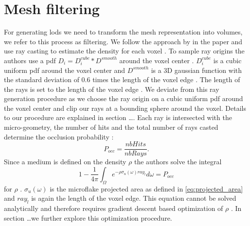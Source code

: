 \section{Mesh filtering}
\label{sec:mesh_filtering}
For generating \acp{lod} we need to transform the mesh representation into volumes, we refer to this process as filtering.
We follow the approach by \citeauthor{hybrid_mesh_volume_lods} in the paper  and use ray casting to estimate the density for each voxel \cite{hybrid_mesh_volume_lods}.
To sample ray origins the authors use a \ac{pdf} $D_i=D_i^{cube} \ast D^{smooth}$ around the voxel center \cite[p. 9]{hybrid_mesh_volume_lods}.
$D_i^{cube}$ is a cubic uniform \ac{pdf} around the voxel center and $D^{smooth}$ is a 3D gaussian function with the standard deviation of 0.6 times the length of the voxel edge \cite[p. 9]{hybrid_mesh_volume_lods}.
The length of the rays is set to the length of the voxel edge \cite[p. 9]{hybrid_mesh_volume_lods}.
We deviate from this ray generation procedure as we choose the ray origin on a cubic uniform \ac{pdf} around the voxel center and clip our rays at a bounding sphere around the voxel.
Details to our procedure are explained in section \dots.
Each ray is intersected with the micro-geometry, the number of hits and the total number of rays casted determine the occlusion probability \cite[p. 8]{hybrid_mesh_volume_lods}:
\begin{equation}
    P_{occ}=\frac{nbHits}{nbRays}.
\end{equation}
Since a medium is defined on the density $\rho$ the authors solve the integral
\begin{equation}
    1 - \frac{1}{4\pi}\int_\Omega e^{-\rho\sigma_u(\omega)ray_l} d\omega = P_{occ}
\end{equation}
for $\rho$ \cite[p. 9]{hybrid_mesh_volume_lods}.
$\sigma_u(\omega)$ is the microflake projected area as defined in \ref{eq:projected_area} and $ray_l$ is again the length of the voxel edge.
This equation cannot be solved analytically and therefore requires gradient descent based optimization of $\rho$ \cite[p. 9]{hybrid_mesh_volume_lods}.
In section \dots we further explore this optimization procedure.


